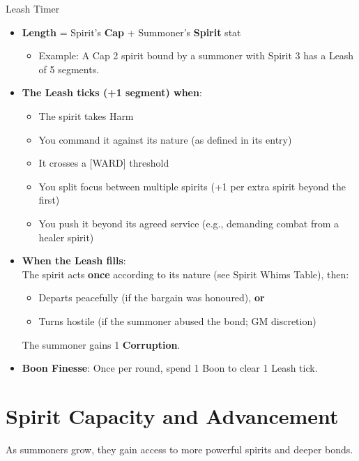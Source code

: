 \documentclass[11pt,twoside]{book}
\begin{document}
\begin{mechbox}{Leash Timer }
  \begin{itemize}
    \item \textbf{Length} = Spirit's \textbf{Cap} + Summoner's \textbf{Spirit} stat
      \begin{itemize}
        \item Example: A Cap 2 spirit bound by a summoner with Spirit 3 has a Leash of 5 segments.
      \end{itemize}
    \item \textbf{The Leash ticks (+1 segment) when}: \\
      \begin{itemize}
        \item The spirit takes Harm
        \item You command it against its nature (as defined in its entry)
        \item It crosses a [WARD] threshold
        \item You split focus between multiple spirits (+1 per extra spirit beyond the first)
        \item You push it beyond its agreed service (e.g., demanding combat from a healer spirit)
      \end{itemize}
    \item \textbf{When the Leash fills}: \\
      The spirit acts \textbf{once} according to its nature (see Spirit Whims Table), then:
      \begin{itemize}
        \item Departs peacefully (if the bargain was honoured), \textbf{or}
        \item Turns hostile (if the summoner abused the bond; GM discretion)
      \end{itemize}
      The summoner gains 1 \textbf{Corruption}.
    \item \textbf{Boon Finesse}: Once per round, spend 1 Boon to clear 1 Leash tick.
  \end{itemize}
\end{mechbox}

\section{Spirit Capacity and Advancement}
As summoners grow, they gain access to more powerful spirits and deeper bonds.
\end{document}
